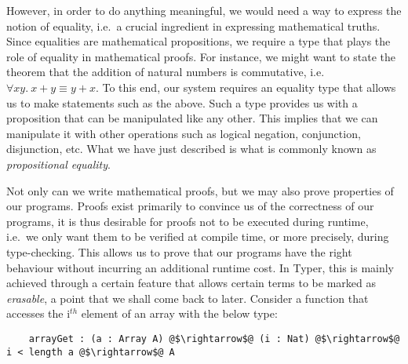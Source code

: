 \documentclass[12pt,twoside,maitrise]{dms}
\theoremstyle{definition}
\numberwithin{equation}{section}
\numberwithin{table}{chapter}
\numberwithin{figure}{chapter}
\begin{document}
However, in order to do anything meaningful, we would need a way to express the
notion of equality, i.e.\ a crucial ingredient in expressing mathematical
truths. Since equalities are mathematical propositions, we require a type that
plays the role of equality in mathematical proofs. For instance, we might want
to state the theorem that the addition of natural numbers is commutative, i.e.
$\forall xy. \ x + y \equiv y + x$. To this end, our system requires an equality
type that allows us to make statements such as the above. Such a type provides
us with a proposition that can be manipulated like any other. This implies that
we can manipulate it with other operations such as logical negation,
conjunction, disjunction, etc. What we have just described is what is commonly
known as \emph{propositional equality}.


Not only can we write mathematical proofs, but we may also prove properties of
our programs. Proofs exist primarily to convince us of the correctness of our
programs, it is thus desirable for proofs not to be executed during runtime,
i.e.\ we only want them to be verified at compile time, or more precisely,
during type-checking. This allows us to prove that our programs have the right
behaviour without incurring an additional runtime cost. In Typer, this is mainly
achieved through a certain feature that allows certain terms to be marked as
\emph{erasable}, a point that we shall come back to later. Consider a function
that accesses the i$^{th}$ element of an array with the below type:

\begin{verbatim}
    arrayGet : (a : Array A) @$\rightarrow$@ (i : Nat) @$\rightarrow$@ i < length a @$\rightarrow$@ A
\end{verbatim}
\end{document}
